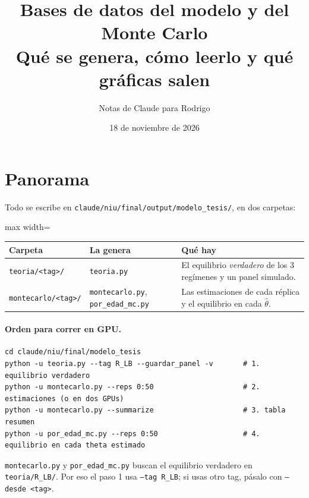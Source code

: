 \documentclass[11pt]{article}
\title{Bases de datos del modelo y del Monte Carlo\\
\large Qué se genera, cómo leerlo y qué gráficas salen}
\author{Notas de Claude para Rodrigo}
\date{18 de noviembre de 2026}
\begin{document}
\maketitle
\tableofcontents

\section{Panorama}

Todo se escribe en \texttt{claude/niu/final/output/modelo\_tesis/}, en dos carpetas:

\begin{center}
\begin{adjustbox}{max width=\textwidth}\begin{tabular}{lll}
\toprule
Carpeta & La genera & Qué hay\\
\midrule
\texttt{teoria/<tag>/} & \texttt{teoria.py} & El equilibrio \emph{verdadero} de los 3 regímenes y un panel simulado.\\
\texttt{montecarlo/<tag>/} & \texttt{montecarlo.py}, \texttt{por\_edad\_mc.py} & Las estimaciones de cada réplica y el equilibrio en cada $\hat\theta$.\\
\bottomrule
\end{tabular}\end{adjustbox}
\end{center}

\paragraph{Orden para correr en GPU.}
\begin{Verbatim}
cd claude/niu/final/modelo_tesis
python -u teoria.py --tag R_LB --guardar_panel -v       # 1. equilibrio verdadero
python -u montecarlo.py --reps 0:50                     # 2. estimaciones (o en dos GPUs)
python -u montecarlo.py --summarize                     # 3. tabla resumen
python -u por_edad_mc.py --reps 0:50                    # 4. equilibrio en cada theta estimado
\end{Verbatim}
\texttt{montecarlo.py} y \texttt{por\_edad\_mc.py} buscan el equilibrio verdadero en
\texttt{teoria/R\_LB/}. Por eso el paso 1 usa \texttt{--tag R\_LB}; si usas otro tag, pásalo
con \texttt{--desde <tag>}.
\end{document}
